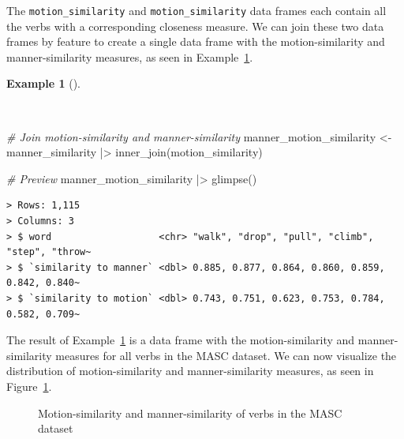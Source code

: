 \documentclass[
  letterpaper,
  DIV=11,
  numbers=noendperiod]{scrreprt}
\newenvironment{Shaded}{\begin{snugshade}}{\end{snugshade}}
\newcommand{\CommentTok}[1]{\textcolor[rgb]{0.00,0.00,0.00}{\textit{#1}}}
\newcommand{\FunctionTok}[1]{\textcolor[rgb]{0.00,0.00,0.00}{#1}}
\newcommand{\NormalTok}[1]{\textcolor[rgb]{0.00,0.00,0.00}{#1}}
\newcommand{\OtherTok}[1]{\textcolor[rgb]{0.00,0.00,0.00}{#1}}
\newcommand{\SpecialCharTok}[1]{\textcolor[rgb]{0.00,0.00,0.00}{#1}}
\theoremstyle{definition}
\newtheorem{example}{Example}[chapter]
\theoremstyle{remark}
\begin{document}
The \texttt{motion\_similarity} and \texttt{motion\_similarity} data
frames each contain all the verbs with a corresponding closeness
measure. We can join these two data frames by feature to create a single
data frame with the motion-similarity and manner-similarity measures, as
seen in Example~\ref{exm-eda-masc-vsm-word2vec-manner-motion}.

\begin{example}[]\protect\hypertarget{exm-eda-masc-vsm-word2vec-manner-motion}{}\label{exm-eda-masc-vsm-word2vec-manner-motion}

~

\begin{Shaded}
\begin{Highlighting}[]
\CommentTok{\# Join motion{-}similarity and manner{-}similarity}
\NormalTok{manner\_motion\_similarity }\OtherTok{\textless{}{-}}
\NormalTok{  manner\_similarity }\SpecialCharTok{|\textgreater{}}
  \FunctionTok{inner\_join}\NormalTok{(motion\_similarity)}

\CommentTok{\# Preview}
\NormalTok{manner\_motion\_similarity }\SpecialCharTok{|\textgreater{}} \FunctionTok{glimpse}\NormalTok{()}
\end{Highlighting}
\end{Shaded}

\begin{verbatim}
> Rows: 1,115
> Columns: 3
> $ word                   <chr> "walk", "drop", "pull", "climb", "step", "throw~
> $ `similarity to manner` <dbl> 0.885, 0.877, 0.864, 0.860, 0.859, 0.842, 0.840~
> $ `similarity to motion` <dbl> 0.743, 0.751, 0.623, 0.753, 0.784, 0.582, 0.709~
\end{verbatim}

\end{example}

The result of Example~\ref{exm-eda-masc-vsm-word2vec-manner-motion} is a
data frame with the motion-similarity and manner-similarity measures for
all verbs in the MASC dataset. We can now visualize the distribution of
motion-similarity and manner-similarity measures, as seen in
Figure~\ref{fig-eda-masc-vsm-word2vec-manner-motion-compare}.

\begin{figure}[H]


\caption{\label{fig-eda-masc-vsm-word2vec-manner-motion-compare}Motion-similarity
and manner-similarity of verbs in the MASC dataset}

\end{figure}%
\end{document}
